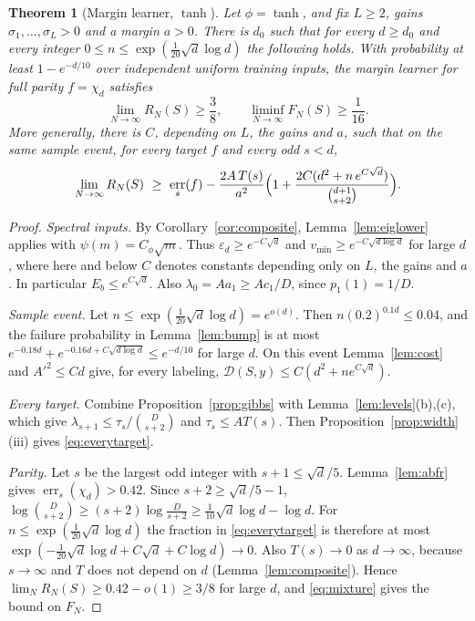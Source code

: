 \documentclass[11pt]{article}
\newtheorem{theorem}{Theorem}[section]
\theoremstyle{definition}\newtheorem{assumption}[theorem]{Assumption}
\theoremstyle{remark}\newtheorem{remark}[theorem]{Remark}
\DeclareMathOperator{\err}{err}
\begin{document}
\begin{theorem}[Margin learner, $\tanh$]\label{thm:margin}
Let $\phi=\tanh$, and fix $L\ge2$, gains $\sigma_1,\ldots,\sigma_L>0$ and a
margin $a>0$. There is $d_0$ such that for every $d\ge d_0$ and every
integer $0\le n\le\exp(\frac1{20}\sqrt d\log d)$ the following holds.
With probability at least $1-e^{-d/10}$ over independent uniform training
inputs, the margin learner for full parity $f=\chi_d$ satisfies
\[
 \lim_{N\to\infty}R_N(S)\ge\frac38,\qquad
 \liminf_{N\to\infty}F_N(S)\ge\frac1{16}.
\]
More generally, there is $C$, depending on $L$, the gains and $a$, such that
on the same sample event, for every target $f$ and every odd $s<d$,
\begin{equation}\label{eq:everytarget}
 \lim_{N\to\infty}R_N(S)\ \ge\ \err_s(f)-\frac{2A\,T(s)}{a^2}
 \Bigl(1+\frac{2C(d^2+n\,e^{C\sqrt d})}{\binom{d+1}{s+2}}\Bigr).
\end{equation}
\end{theorem}
\begin{proof}
\emph{Spectral inputs.} By Corollary~\ref{cor:composite},
Lemma~\ref{lem:eiglower} applies with $\psi(m)=C_\phi\sqrt m$. Thus
$\varepsilon_d\ge e^{-C\sqrt d}$ and $v_{\min}\ge e^{-C\sqrt{d\log d}}$ for large
$d$, where here and below $C$ denotes constants depending only on $L$, the
gains and $a$. In particular $E_b\le e^{C\sqrt d}$. Also
$\lambda_0=Aa_1\ge Ac_1/D$, since $p_1(1)=1/D$.

\emph{Sample event.} Let $n\le\exp(\frac1{20}\sqrt d\log d)=e^{o(d)}$. Then
$n(0.2)^{0.1d}\le0.04$, and the failure probability in
Lemma~\ref{lem:bump} is at most
$e^{-0.18d}+e^{-0.16d+C\sqrt{d\log d}}\le e^{-d/10}$ for large $d$. On this
event Lemma~\ref{lem:cost} and $A'^2\le Cd$ give, for every labeling,
$\mathcal D(S,y)\le C(d^2+n e^{C\sqrt d})$.

\emph{Every target.} Combine Proposition~\ref{prop:gibbs} with
Lemma~\ref{lem:levels}(b),(c), which give
$\lambda_{s+1}\le\tau_s/\binom D{s+2}$ and $\tau_s\le AT(s)$. Then
Proposition~\ref{prop:width}(iii) gives \eqref{eq:everytarget}.

\emph{Parity.} Let $s$ be the largest odd integer with
$s+1\le\sqrt d/5$. Lemma~\ref{lem:abfr} gives $\err_s(\chi_d)>0.42$. Since
$s+2\ge\sqrt d/5-1$,
$\log\binom D{s+2}\ge(s+2)\log\frac D{s+2}\ge\frac1{10}\sqrt d\log d-\log d$.
For $n\le\exp(\frac1{20}\sqrt d\log d)$ the fraction in
\eqref{eq:everytarget} is therefore at most
$\exp(-\frac1{20}\sqrt d\log d+C\sqrt d+C\log d)\to0$. Also $T(s)\to0$ as
$d\to\infty$, because $s\to\infty$ and $T$ does not depend on $d$
(Lemma~\ref{lem:composite}). Hence $\lim_NR_N(S)\ge0.42-o(1)\ge3/8$ for
large $d$, and \eqref{eq:mixture} gives the bound on $F_N$.
\end{proof}
\end{document}
